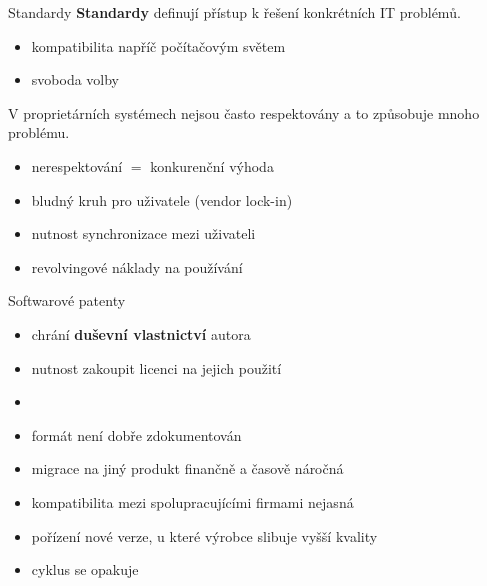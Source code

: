 \documentclass[11pt]{beamer}
\begin{document}
\begin{frame}{Standardy}
	\textbf{Standardy} definují přístup k řešení konkrétních IT problémů.
 	 	
	\begin{itemize}
		\item kompatibilita napříč počítačovým světem
		\item svoboda volby
	\end{itemize}
	V proprietárních systémech nejsou často respektovány a to způsobuje mnoho problému.
	\begin{itemize}
		\item nerespektování $=$ konkurenční výhoda
		\item bludný kruh pro uživatele (vendor lock-in)
		\item nutnost synchronizace mezi uživateli
		\item revolvingové náklady na používání
	\end{itemize}
\end{frame}

\begin{frame}{Softwarové patenty}

	
	\begin{itemize}
		\item chrání \textbf{duševní vlastnictví} autora
		\item nutnost zakoupit licenci na jejich použití
		\item 
		\item formát není dobře zdokumentován
		\item migrace na jiný produkt finančně a časově náročná
		\item kompatibilita mezi spolupracujícími firmami nejasná
		\item pořízení nové verze, u které výrobce slibuje vyšší kvality
		\item cyklus se opakuje
	\end{itemize}
\end{frame}
\end{document}
